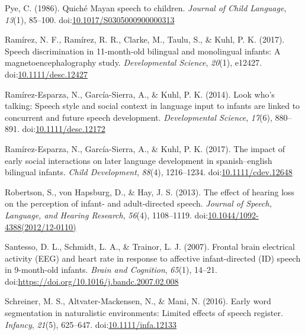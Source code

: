 \documentclass[,man,floatsintext]{apa6}
\begin{document}
\leavevmode\hypertarget{ref-pye_1986}{}%
Pye, C. (1986). Quiché Mayan speech to children. \emph{Journal of Child Language}, \emph{13}(1), 85--100. doi:\href{https://doi.org/10.1017/S0305000900000313}{10.1017/S0305000900000313}

\leavevmode\hypertarget{ref-ramirez_2017}{}%
Ramírez, N. F., Ramírez, R. R., Clarke, M., Taulu, S., \& Kuhl, P. K. (2017). Speech discrimination in 11-month-old bilingual and monolingual infants: A magnetoencephalography study. \emph{Developmental Science}, \emph{20}(1), e12427. doi:\href{https://doi.org/10.1111/desc.12427}{10.1111/desc.12427}

\leavevmode\hypertarget{ref-ramirez_esparza_2014}{}%
Ramírez-Esparza, N., García-Sierra, A., \& Kuhl, P. K. (2014). Look who's talking: Speech style and social context in language input to infants are linked to concurrent and future speech development. \emph{Developmental Science}, \emph{17}(6), 880--891. doi:\href{https://doi.org/10.1111/desc.12172}{10.1111/desc.12172}

\leavevmode\hypertarget{ref-ramirez_esparza_2017}{}%
Ramírez-Esparza, N., García-Sierra, A., \& Kuhl, P. K. (2017). The impact of early social interactions on later language development in spanish--english bilingual infants. \emph{Child Development}, \emph{88}(4), 1216--1234. doi:\href{https://doi.org/10.1111/cdev.12648}{10.1111/cdev.12648}

\leavevmode\hypertarget{ref-robertson_2013}{}%
Robertson, S., von Hapsburg, D., \& Hay, J. S. (2013). The effect of hearing loss on the perception of infant- and adult-directed speech. \emph{Journal of Speech, Language, and Hearing Research}, \emph{56}(4), 1108--1119. doi:\href{https://doi.org/10.1044/1092-4388(2012/12-0110)}{10.1044/1092-4388(2012/12-0110)}

\leavevmode\hypertarget{ref-santesso_2007}{}%
Santesso, D. L., Schmidt, L. A., \& Trainor, L. J. (2007). Frontal brain electrical activity (EEG) and heart rate in response to affective infant-directed (ID) speech in 9-month-old infants. \emph{Brain and Cognition}, \emph{65}(1), 14--21. doi:\href{https://doi.org/https://doi.org/10.1016/j.bandc.2007.02.008}{https://doi.org/10.1016/j.bandc.2007.02.008}

\leavevmode\hypertarget{ref-schreiner_2016}{}%
Schreiner, M. S., Altvater-Mackensen, N., \& Mani, N. (2016). Early word segmentation in naturalistic environments: Limited effects of speech register. \emph{Infancy}, \emph{21}(5), 625--647. doi:\href{https://doi.org/10.1111/infa.12133}{10.1111/infa.12133}
\end{document}
